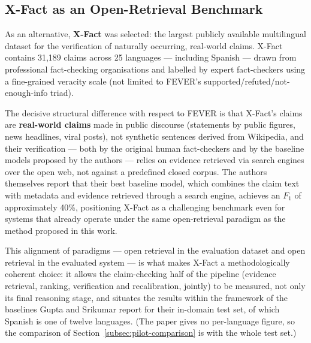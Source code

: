 
\subsection{X-Fact as an Open-Retrieval Benchmark}
\label{subsec:xfact}

As an alternative, \textbf{X-Fact} \cite{gupta2021xfact} was
selected: the largest publicly available multilingual dataset for
the verification of naturally occurring, real-world claims. X-Fact
contains 31,189 claims across 25 languages --- including Spanish ---
drawn from professional fact-checking organisations and labelled by
expert fact-checkers using a fine-grained veracity scale (not limited
to FEVER's supported/refuted/not-enough-info triad).

The decisive structural difference with respect to FEVER is that
X-Fact's claims are \textbf{real-world claims} made in public
discourse (statements by public figures, news headlines, viral
posts), not synthetic sentences derived from Wikipedia, and their
verification --- both by the original human fact-checkers and by the
baseline models proposed by the authors --- relies on evidence
retrieved via search engines over the open web, not against a
predefined closed corpus. The authors themselves report that their
best baseline model, which combines the claim text with metadata and
evidence retrieved through a search engine, achieves an $F_1$ of
approximately 40\%, positioning X-Fact as a challenging benchmark
even for systems that already operate under the same open-retrieval
paradigm as the method proposed in this work.

This alignment of paradigms --- open retrieval in the evaluation
dataset and open retrieval in the evaluated system --- is what makes
X-Fact a methodologically coherent choice: it allows the
claim-checking half of the pipeline (evidence retrieval, ranking,
verification and recalibration, jointly) to be measured, not only its
final reasoning stage, and situates the results within the framework
of the baselines Gupta and Srikumar \cite{gupta2021xfact} report for
their in-domain test set, of which Spanish is one of twelve languages.
(The paper gives no per-language figure, so the comparison of
Section~\ref{subsec:pilot-comparison} is with the whole test set.)

